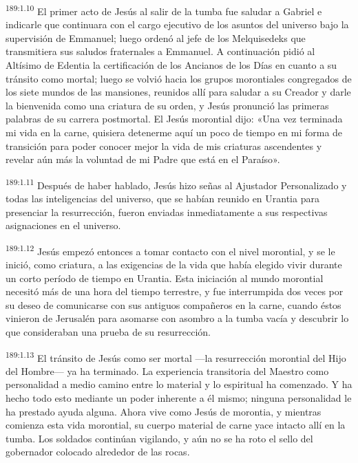 \par
\textsuperscript{189:1.10} El primer acto de Jesús al salir de la tumba fue saludar a Gabriel e indicarle que continuara con el cargo ejecutivo de los asuntos del universo bajo la supervisión de Emmanuel; luego ordenó al jefe de los Melquisedeks que transmitiera sus saludos fraternales a Emmanuel. A continuación pidió al Altísimo de Edentia la certificación de los Ancianos de los Días en cuanto a su tránsito como mortal; luego se volvió hacia los grupos morontiales congregados de los siete mundos de las mansiones, reunidos allí para saludar a su Creador y darle la bienvenida como una criatura de su orden, y Jesús pronunció las primeras palabras de su carrera postmortal. El Jesús morontial dijo: «Una vez terminada mi vida en la carne, quisiera detenerme aquí un poco de tiempo en mi forma de transición para poder conocer mejor la vida de mis criaturas ascendentes y revelar aún más la voluntad de mi Padre que está en el Paraíso».

\par
\textsuperscript{189:1.11} Después de haber hablado, Jesús hizo señas al Ajustador Personalizado y todas las inteligencias del universo, que se habían reunido en Urantia para presenciar la resurrección, fueron enviadas inmediatamente a sus respectivas asignaciones en el universo.

\par
\textsuperscript{189:1.12} Jesús empezó entonces a tomar contacto con el nivel morontial, y se le inició, como criatura, a las exigencias de la vida que había elegido vivir durante un corto período de tiempo en Urantia. Esta iniciación al mundo morontial necesitó más de una hora del tiempo terrestre, y fue interrumpida dos veces por su deseo de comunicarse con sus antiguos compañeros en la carne, cuando éstos vinieron de Jerusalén para asomarse con asombro a la tumba vacía y descubrir lo que consideraban una prueba de su resurrección.

\par
\textsuperscript{189:1.13} El tránsito de Jesús como ser mortal ---la resurrección morontial del Hijo del Hombre--- ya ha terminado. La experiencia transitoria del Maestro como personalidad a medio camino entre lo material y lo espiritual ha comenzado. Y ha hecho todo esto mediante un poder inherente a él mismo; ninguna personalidad le ha prestado ayuda alguna. Ahora vive como Jesús de morontia, y mientras comienza esta vida morontial, su cuerpo material de carne yace intacto allí en la tumba. Los soldados continúan vigilando, y aún no se ha roto el sello del gobernador colocado alrededor de las rocas.

